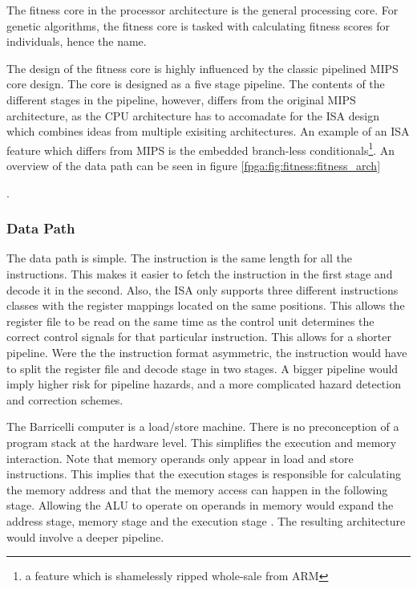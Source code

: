 The fitness core in the processor architecture is the general processing core.
For genetic algorithms, the fitness core is tasked with calculating fitness scores for individuals, hence the name.

The design of the fitness core is highly influenced by the classic pipelined \gls{MIPS} core design\cn.
The core is designed as a five stage pipeline.
The contents of the different stages in the pipeline, however, differs from the original \gls{MIPS} architecture, as the CPU architecture has to accomadate for the \gls{ISA} design which combines ideas from multiple exisiting architectures.
An example of an \gls{ISA} feature which differs from \gls{MIPS} is the embedded branch-less conditionals\footnote{a feature which is shamelessly ripped whole-sale from ARM}.
An overview of the data path can be seen in figure \vref{fpga:fig:fitness:fitness_arch}

.

\subsubsection{Data Path} 

The data path is simple.
The instruction is the same length for all the instructions.
This makes it easier to fetch the instruction in the first stage and decode it in the second.
Also, the ISA only supports three different instructions classes with the register mappings located on the same positions.
This allows the register file to be read on the same time as the control unit determines the correct control signals for that particular instruction.
This allows for a shorter pipeline.
Were the the instruction format asymmetric, the instruction would have to split the register file and decode stage in two stages.
A bigger pipeline would imply higher risk for pipeline hazards, and a more complicated hazard detection and correction schemes. 

The Barricelli computer is a load/store machine.
There is no preconception of a program stack at the hardware level.
This simplifies the execution and memory interaction.
Note that memory operands only appear in load and store instructions.
This implies that the execution stages is responsible for calculating the memory address and that the memory access can happen in the following stage.
Allowing the ALU to operate on operands in memory would expand the address stage, memory stage and the execution stage \cite[p.~335]{compOrgDes}.
The resulting architecture would involve a deeper pipeline. 


